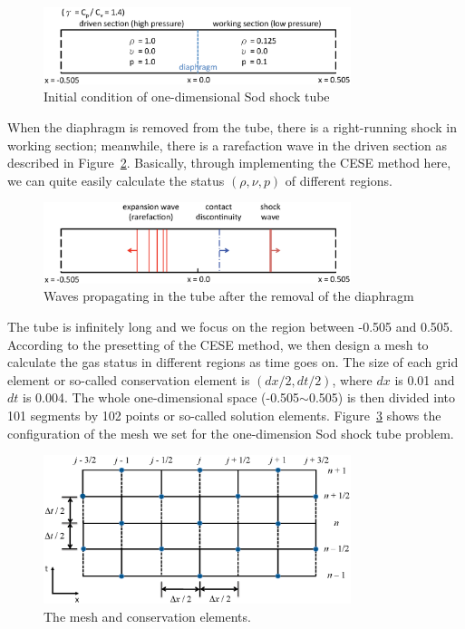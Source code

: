 \documentclass[a4paper,12pt,dvips]{article}
\begin{document}
 \begin{figure}[hbtp]
    \centering
     \includegraphics[width=0.8\textwidth]{sod_shock_tube_1D.eps}
     \caption{Initial condition of one-dimensional Sod shock tube}
     \label{fig:sod_shock_tube_1D}
 \end{figure}

When the diaphragm is removed from the tube, there is a right-running shock in 
working section; meanwhile, there is a rarefaction wave in the driven section as
described in Figure~\ref{fig:sod_shock_tube_1D_no_diaphragm}. Basically, 
through implementing the CESE method here, we can quite easily calculate the 
status $(\rho, \nu, p)$ of different regions.

 \begin{figure}[hbtp]
    \centering
     \includegraphics[width=0.8\textwidth]{sod_shock_tube_1D_no_diaphragm.eps}
     \caption{Waves propagating in the tube after the removal of the diaphragm}
     \label{fig:sod_shock_tube_1D_no_diaphragm}
 \end{figure}

The tube is infinitely long and we focus on the region between -0.505 and 0.505.
According to the presetting of the CESE method, we then design a mesh to 
calculate the gas status in different regions as time goes on. The size of each 
grid element or so-called conservation element is $(dx/2, dt/2)$, where $dx$ is 
0.01 and $dt$ is 0.004. The whole one-dimensional space (-0.505$\sim$0.505) is 
then divided into 101 segments by 102 points or so-called solution elements.
Figure~\ref{fig:mesh_and_ce_v2} shows the configuration of the mesh we set for 
the one-dimension Sod shock tube problem.

 \begin{figure}[ht]
    \centering
     \includegraphics[width=0.8\textwidth]{mesh_and_ce.eps}
     \caption{The mesh and conservation elements.}
     \label{fig:mesh_and_ce_v2}
 \end{figure}
\end{document}
